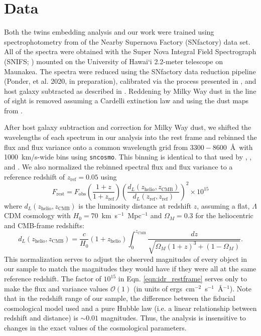 \section{Data} \label{sec:nn_twins_data}
Both the twins embedding analysis and our work were trained using spectrophotometry from of the Nearby Supernova Factory (SNfactory) data set. All of the spectra were obtained with the Super Nova Integral Field Spectrograph (SNIFS; \cite{lantz_snifs_2004})  mounted on the University of Hawai`i 2.2-meter telescope on Maunakea. The spectra were reduced using the SNfactory data reduction pipeline (Ponder, et al. 2020, in preparation), calibrated via the process presented in \cite{buton_atmospheric_2013}, and host galaxy subtracted as described in \cite{bongard_3d_2011}. Reddening by Milky Way dust in the line of sight is removed assuming a Cardelli \citep{cardelli_relationship_1989} extinction law and using the dust maps from \cite{schlegel_maps_1998}.

After host galaxy subtraction and correction for Milky Way dust, we shifted the wavelengths of each spectrum in our analysis into the rest frame and rebinned the flux and flux variance onto a common wavelength grid from $3300 - 8600$~\AA\ with 1000~km/s-wide bins using \texttt{sncosmo}. This binning is identical to that used by \cite{fakhouri_improving_2015}, \cite{saunders_snemo_2018}, and \cite{boone_twins_2020a}. We also normalized the rebinned spectral flux and flux variance to a reference redshift of $z_\mathrm{ref}=0.05$ using
\begin{equation}
    F_\mathrm{rest} = F_\mathrm{obs} \left(\frac{1+z}{1+z_\mathrm{ref}}\right)\left(\frac{d_L(z_\mathrm{helio}, z_\mathrm{CMB})}{d_L(z_\mathrm{ref}, z_\mathrm{ref})}\right)^2 \times 10^{15}
    \label{eqn:idr_restframe}
\end{equation}
where $d_L(z_\mathrm{helio}, z_\mathrm{CMB})$ is the luminosity distance at redshift $z$, assuming a flat, $\Lambda$CDM cosmology with $H_0=70$~km~s$^{-1}$~Mpc$^{-1}$ and $\Omega_M=0.3$ for the heliocentric and CMB-frame redshifts:
\begin{equation}
    d_L(z_\mathrm{helio}, z_\mathrm{CMB}) = \frac{c}{H_0}(1+z_\mathrm{helio})\displaystyle\int_0^{z_\mathrm{CMB}} \frac{dz}{\sqrt{\Omega_M(1+z)^3 + (1-\Omega_M)}}.
\end{equation}
This normalization serves to adjust the observed magnitudes of every object in our sample to match the magnitudes they would have if they were all at the same reference redshift. The factor of $10^{15}$ in Eqn. \ref{eqn:idr_restframe} serves only to make the flux and variance values $\mathcal{O}(1)$ (in units of ergs~cm$^{-2}$~s$^{-1}$~\AA$^{-1}$). Note that in the redshift range of our sample, the difference between the fiducial cosmological model used and a pure Hubble law (i.e. a linear relationship between redshift and distance) is $\sim 0.01$ magnitudes. Thus, the analysis is insensitive to changes in the exact values of the cosmological parameters.

